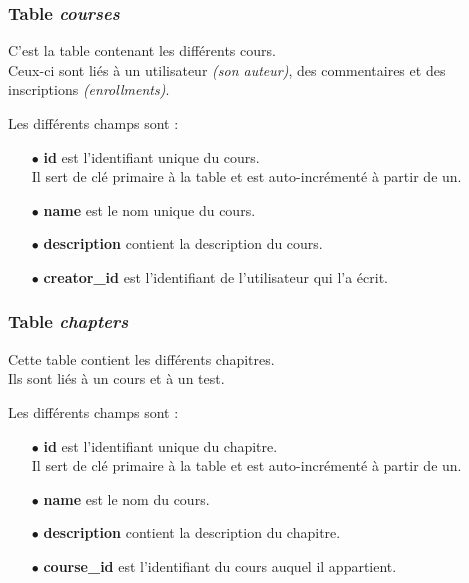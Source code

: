 \subsubsection{Table \textit{courses}}
\label{sec:table-courses}
C'est la table contenant les différents cours.\\
Ceux-ci sont liés à un utilisateur \textit{(son auteur)}, des commentaires et des inscriptions \textit{(enrollments)}.

Les différents champs sont :

\begin{itemize}
    
    \item[$\bullet$] \textbf{id} est l'identifiant unique du cours.\\
    Il sert de clé primaire à la table et est auto-incrémenté à partir de un.
    
    \item[$\bullet$] \textbf{name} est le nom unique du cours.
    
    \item[$\bullet$] \textbf{description} contient la description du cours.
    
    \item[$\bullet$] \textbf{creator\_id} est l'identifiant de l'utilisateur qui l'a écrit.
    
\end{itemize}

\newpage

\subsubsection{Table \textit{chapters}}
\label{sec:table-chapters}
Cette table contient les différents chapitres.\\
Ils sont liés à un cours et à un test.

Les différents champs sont :

\begin{itemize}
    
    \item[$\bullet$] \textbf{id} est l'identifiant unique du chapitre.\\
    Il sert de clé primaire à la table et est auto-incrémenté à partir de un.
    
    \item[$\bullet$] \textbf{name} est le nom du cours.
    
    \item[$\bullet$] \textbf{description} contient la description du chapitre.
    
    \item[$\bullet$] \textbf{course\_id} est l'identifiant du cours auquel il appartient.
    
\end{itemize}


